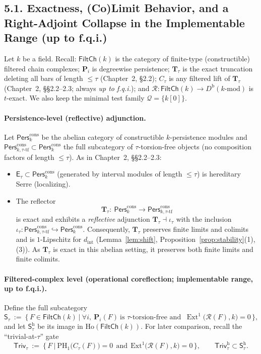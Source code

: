 \documentclass[11pt]{article}
\numberwithin{equation}{section}
\theoremstyle{plain}
\theoremstyle{definition}
\theoremstyle{remark}
\DeclareMathOperator{\Ext}{Ext}
\DeclareRobustCommand{\hyp}{\nobreakdash-}
\theoremstyle{plain}
\theoremstyle{definition}
\numberwithin{equation}{section}
\theoremstyle{definition}
\numberwithin{equation}{section}
\theoremstyle{plain}
\theoremstyle{definition}
\theoremstyle{remark}
\begin{document}
\subsection*{5.1. Exactness, (Co)Limit Behavior, and a Right\hyp Adjoint Collapse in the Implementable Range (up to f.q.i.)}

Let $k$ be a field. Recall: $\mathsf{FiltCh}(k)$ is the category of finite\hyp type (constructible) filtered chain complexes; $\mathbf{P}_i$ is degreewise persistence; $\mathbf{T}_\tau$ is the exact truncation deleting all bars of length $\le\tau$ (Chapter~2, §2.2); $C_\tau$ is any filtered lift of $\mathbf{T}_\tau$ (Chapter~2, §§2.2–2.3; always \emph{up to f.q.i.}); and $\mathcal{R}:\mathsf{FiltCh}(k)\to D^{\mathrm{b}}(k\text{-mod})$ is $t$-exact. We also keep the minimal test family $\mathcal{Q}=\{k[0]\}$.

\paragraph{Persistence\hyp level (reflective) adjunction.}
Let $\mathsf{Pers}^{\mathrm{cons}}_k$ be the abelian category of constructible $k$-persistence modules and $\mathsf{Pers}^{\mathrm{cons}}_{k,\tau\text{-tf}}\subset \mathsf{Pers}^{\mathrm{cons}}_k$ the full subcategory of $\tau$-torsion-free objects (no composition factors of length $\le\tau$). As in Chapter~2, §§2.2–2.3:
\begin{itemize}
  \item $\mathsf{E}_\tau\subset \mathsf{Pers}^{\mathrm{cons}}_k$ (generated by interval modules of length $\le\tau$) is hereditary Serre (localizing).
  \item The reflector
  \[
  \mathbf{T}_\tau:\ \mathsf{Pers}^{\mathrm{cons}}_k\longrightarrow \mathsf{Pers}^{\mathrm{cons}}_{k,\tau\text{-tf}}
  \]
  is exact and exhibits a \emph{reflective} adjunction $\mathbf{T}_\tau\dashv \iota_\tau$ with the inclusion
  $\iota_\tau:\mathsf{Pers}^{\mathrm{cons}}_{k,\tau\text{-tf}}\hookrightarrow \mathsf{Pers}^{\mathrm{cons}}_k$.
  Consequently, $\mathbf{T}_\tau$ preserves finite limits and colimits and is $1$-Lipschitz for $d_{\mathrm{int}}$
  (Lemma~\ref{lem:shift}, Proposition~\ref{prop:stability}(1),(3)). As $\mathbf{T}_\tau$ is exact in this abelian setting, it preserves both finite limits and finite colimits.
\end{itemize}

\paragraph{Filtered\hyp complex level (operational coreflection; implementable range, up to f.q.i.).}
Define the full subcategory
\[
\mathsf{S}_\tau\ :=\ \Big\{\,F\in \mathsf{FiltCh}(k)\ \Big|\ \forall i,\ \mathbf{P}_i(F)\ \text{is $\tau$-torsion-free and }\ \Ext^1\!\big(\mathcal{R}(F),k\big)=0\,\Big\},
\]
and let $\mathsf{S}_\tau^{\mathrm{h}}$ be its image in $\mathrm{Ho}(\mathsf{FiltCh}(k))$.
For later comparison, recall the “trivial-at-$\tau$” gate
\[
\mathsf{Triv}_\tau\ :=\ \Big\{\,F\ \Big|\ \mathrm{PH}_1\big(C_\tau(F)\big)=0\ \ \text{and}\ \ \mathrm{Ext}^1\!\big(\mathcal{R}(F),k\big)=0\,\Big\},\qquad \mathsf{Triv}_\tau^{\mathrm{h}}\subset \mathsf{S}_\tau^{\mathrm{h}}.
\]
\end{document}

